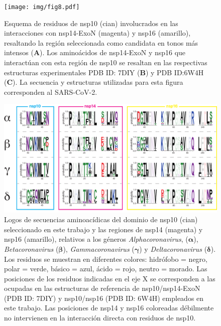 \newpage

\begin{figure}[H]
    \centering
    \texttt{[image: img/fig8.pdf]}
    \caption{Esquema de residuos de nsp10 (cian) involucrados en las 
    interacciones con nsp14-ExoN (magenta) y nsp16 (amarillo), resaltando 
    la región seleccionada como candidata en tonos más intensos (\textbf{A}). 
    Los aminoácidos de nsp14-ExoN y nsp16 que interactúan con esta región de 
    nsp10 se resaltan en las respectivas estructuras experimentales PDB ID:\@ 
    7DIY (\textbf{B}) y PDB ID:\@ 6W4H (\textbf{C}). La secuencia y 
    estructuras utilizadas para esta figura corresponden al SARS-CoV-2.}\label{fig:interactions}
\end{figure}

\begin{figure}
    \centering
    \includegraphics[width=1\textwidth]{img/fig9.pdf}
    \caption{Logos de secuencias aminoacídicas del dominio de nsp10 (cian) 
    seleccionado en este trabajo y las regiones de nsp14 (magenta) y nsp16 
    (amarillo), relativos a los géneros \textit{Alphacoronavirus}, ($\bm{\alpha}$), 
    \textit{Betacoronavirus} ($\bm{\beta}$), \textit{Gammacoronavirus} ($\bm{\gamma}$) y \textit{Deltacoronavirus} 
    ($\bm{\delta}$). Los residuos se muestran en diferentes colores: 
    hidrófobo = negro, polar = verde, básico = azul, ácido = rojo, neutro 
    = morado. Las posiciones de los residuos indicadas en el eje X se 
    corresponden a las ocupadas en las estructuras de referencia de 
    nsp10/nsp14-ExoN (PDB ID: 7DIY) y nsp10/nsp16 (PDB ID: 6W4H) empleados 
    en este trabajo. Las posiciones de nsp14 y nsp16 coloreadas débilmente 
    no intervienen en la interacción directa con residuos de nsp10.}\label{fig:logos}
\end{figure}

